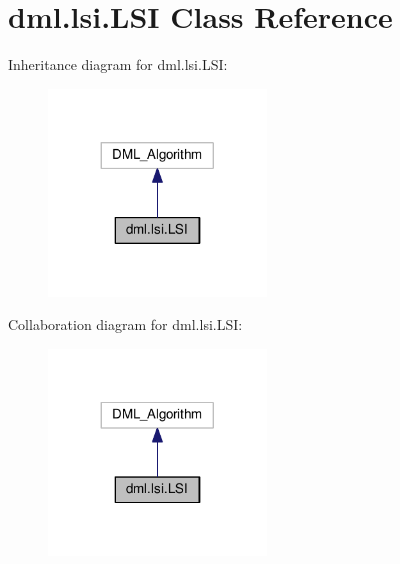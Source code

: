 \hypertarget{classdml_1_1lsi_1_1LSI}{}\section{dml.\+lsi.\+L\+SI Class Reference}
\label{classdml_1_1lsi_1_1LSI}


Inheritance diagram for dml.\+lsi.\+L\+SI\+:
\nopagebreak
\begin{figure}[H]
\begin{center}
\leavevmode
\includegraphics[width=164pt]{classdml_1_1lsi_1_1LSI__inherit__graph}
\end{center}
\end{figure}


Collaboration diagram for dml.\+lsi.\+L\+SI\+:
\nopagebreak
\begin{figure}[H]
\begin{center}
\leavevmode
\includegraphics[width=164pt]{classdml_1_1lsi_1_1LSI__coll__graph}
\end{center}
\end{figure}
